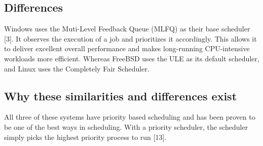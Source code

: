 \documentclass[onecolumn, draftclsnofoot,10pt, compsoc]{IEEEtran}
\begin{document}
\subsection{Differences}

Windows uses the Muti-Level Feedback Queue (MLFQ) as their base scheduler [3]. It observes the execution of a job and prioritizes it accordingly. This allows it to deliver excellent overall performance and makes long-running CPU-intensive workloads more efficient. Whereas FreeBSD uses the ULE as its default scheduler, and Linux uses the Completely Fair Scheduler.


\subsection{Why these similarities and differences exist}

All three of these systems have priority based scheduling and has been proven to be one of the best ways in scheduling. With a priority scheduler, the scheduler simply picks the highest priority process to run [13].
\end{document}
